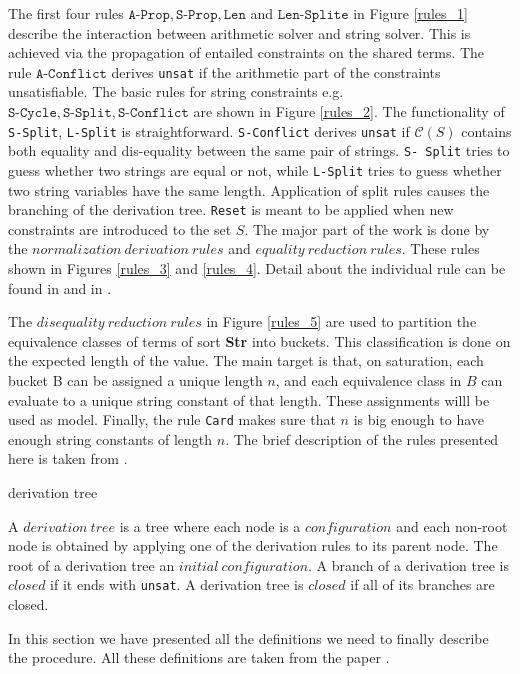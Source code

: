     The first four rules $\texttt{A-Prop},\texttt{S-Prop},\texttt{Len}$ and $\texttt{Len-Splite}$  in Figure \ref{rules_1} describe the interaction between arithmetic solver and string solver. This is achieved via the propagation of entailed constraints on the shared terms. The rule $\texttt{A-Conflict}$ derives \texttt{unsat} if the arithmetic part of the constraints unsatisfiable. The basic rules for string constraints e.g. $\texttt{S-Cycle},\texttt{S-Split},\texttt{S-Conflict}$ are shown in Figure \ref{rules_2}. The functionality of \texttt{S-Split}, \texttt{L-Split} is straightforward. \texttt{S-Conflict} derives  \texttt{unsat} if $\mathcal{C}(S)$ contains both equality and dis-equality between the same pair of strings. \texttt{S- Split}  tries to guess whether two strings are equal or not, while \texttt{L-Split} tries to guess whether two string variables have the same length.  Application of split rules causes the branching of the derivation tree. \texttt{Reset} is meant to be applied when new constraints are introduced to the set $S$. The major part of the work is done by the $normalization\ derivation\ rules$ and $equality\ reduction\ rules$. These rules shown in Figures \ref{rules_3} and \ref{rules_4}. Detail about the individual rule can be found in \cite{main_phd} and in \cite{main-paper}.
   
   
   
   
   
   
   
     
      
   
    
    The $disequality\ reduction\ rules$ in Figure \ref{rules_5} are used to partition the equivalence classes of terms of sort \textbf{Str} into buckets. This classification is done on the expected length of the value. The main target is that, on saturation, each bucket B can be assigned a unique length $n$, and each equivalence class in $B$ can evaluate to a unique string constant of that length. These assignments willl be used as model.  Finally, the rule \texttt{Card} makes sure that $n$ is big enough to have enough string constants of length $n$. The brief description of the rules presented here is taken from \cite{main_phd}. 
 

\begin{definition}{derivation tree}
\end{definition}
A $derivation \ tree$ is a tree where each node is a $configuration$ and each non-root node is obtained by applying one of the derivation rules to its parent node. The root of a derivation tree an $initial \ configuration$. A branch of a derivation tree is $closed$ if it ends with \texttt{unsat}. A derivation tree is $closed$ if all of its branches are closed.	


In this section we have presented all the definitions we need to finally describe the procedure. All these definitions are taken from the paper \cite{main-paper}.   




